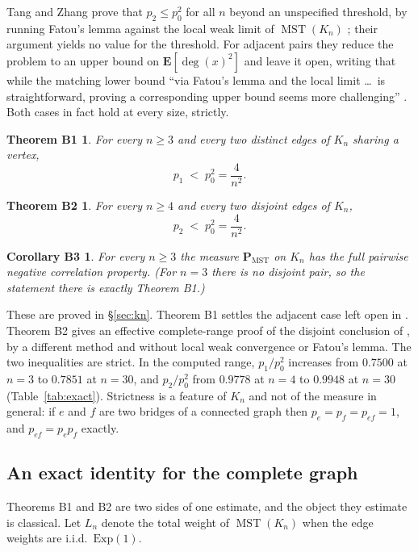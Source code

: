 \documentclass[10pt,a4paper]{amsart}
\newtheorem*{theoremB1}{Theorem B1}
\newtheorem*{theoremB2}{Theorem B2}
\newtheorem*{theoremB3}{Corollary B3}
\newcommand{\MST}{\operatorname{MST}}
\newcommand{\PMST}{\mathbf{P}_{\mathrm{MST}}}
\newcommand{\E}{\mathbf{E}}
\DeclareMathOperator{\dg}{deg}
\begin{document}
Tang and Zhang \cite[Theorem 1.1]{TZ} prove that $p_2\le p_0^2$ for all $n$
beyond an unspecified threshold, by running Fatou's lemma against the local weak
limit of $\MST(K_n)$ \cite{ABerry}; their argument yields no value for the
threshold. For adjacent pairs they reduce the problem to an upper bound on
$\E[\dg(x)^2]$ and leave it open, writing that while the matching lower bound
``via Fatou's lemma and the local limit \dots\ is straightforward, proving a
corresponding upper bound seems more challenging'' \cite[\S3.2.2]{TZ}. Both
cases in fact hold at every size, strictly.

\begin{theoremB1}
For every $n\ge3$ and every two distinct edges of $K_n$ sharing a vertex,
\[
p_1\;<\;p_0^2=\frac4{n^2}.
\]
\end{theoremB1}

\begin{theoremB2}
For every $n\ge4$ and every two disjoint edges of $K_n$,
\[
p_2\;<\;p_0^2=\frac4{n^2}.
\]
\end{theoremB2}

\begin{theoremB3}
For every $n\ge3$ the measure $\PMST$ on $K_n$ has the full pairwise negative
correlation property. (For $n=3$ there is no disjoint pair, so the statement
there is exactly Theorem B1.)
\end{theoremB3}

These are proved in \S\ref{sec:kn}. Theorem B1 settles the adjacent case left
open in \cite[\S3.2.2]{TZ}. Theorem B2 gives an effective complete-range proof
of the disjoint conclusion of \cite[Theorem 1.1]{TZ}, by a different method and
without local weak convergence or Fatou's lemma. The two inequalities are
strict. In the computed range,
$p_1/p_0^2$ increases from $0.7500$ at $n=3$ to $0.7851$ at $n=30$, and
$p_2/p_0^2$ from $0.9778$ at $n=4$ to $0.9948$ at $n=30$
(Table~\ref{tab:exact}). Strictness is a feature of $K_n$ and not of the
measure in general: if $e$ and $f$ are two bridges of a connected graph then
$p_e=p_f=p_{ef}=1$, and $p_{ef}=p_ep_f$ exactly.

\subsection{An exact identity for the complete graph}
\label{ssec:introD}

Theorems B1 and B2 are two sides of one estimate, and the object they estimate
is classical. Let $L_n$ denote the total weight of $\MST(K_n)$ when the edge
weights are i.i.d.\ $\mathrm{Exp}(1)$.
\end{document}
